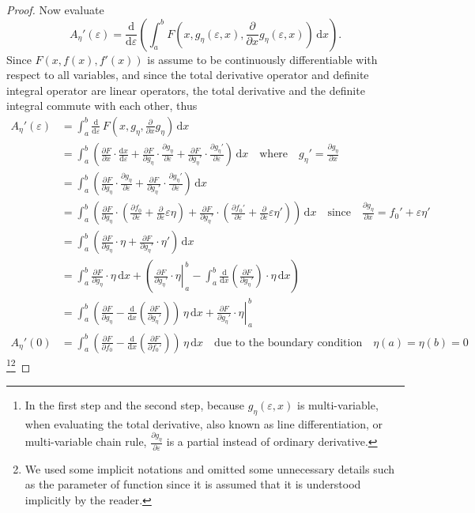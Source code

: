 \documentclass[12pt,a4paper]{article}
\begin{document}
\begin{proof}
Now evaluate
\[
{A_\eta}'(\varepsilon)=\frac{\mathrm{d}}{\mathrm{d}\varepsilon}\left(\int_a^bF\left(x,g_\eta(\varepsilon,x),\frac{\partial}{\partial x}g_\eta(\varepsilon,x)\right)\,\mathrm{d}x\right).
\]
Since $F(x,f(x),f'(x))$ is assume to be continuously differentiable with respect to all variables, and since the total derivative operator and definite integral operator are linear operators, the total derivative and the definite integral commute with each other, thus
\begin{align*}
{A_\eta}'(\varepsilon)&=\int_a^b\frac{\mathrm{d}}{\mathrm{d}\varepsilon}\,F\left(x,g_\eta,\frac{\partial}{\partial x}g_\eta\right)\,\mathrm{d}x\\
&=\int_a^b\left(\frac{\partial F}{\partial x}\cdot\frac{\mathrm{d}x}{\mathrm{d}\varepsilon}+\frac{\partial F}{\partial g_\eta}\cdot\frac{\partial g_\eta}{\partial\varepsilon}+\frac{\partial F}{\partial {g_\eta}'}\cdot\frac{\partial{g_\eta}'}{\partial\varepsilon}\right)\,\mathrm{d}x\quad\text{where}\quad{g_\eta}'=\frac{\partial g_\eta}{\partial x}\\
&=\int_a^b\left(\frac{\partial F}{\partial g_\eta}\cdot\frac{\partial g_\eta}{\partial\varepsilon}+\frac{\partial F}{\partial {g_\eta}'}\cdot\frac{\partial{g_\eta}'}{\partial\varepsilon}\right)\,\mathrm{d}x\\
&=\int_a^b\left(\frac{\partial F}{\partial g_\eta}\cdot\left(\frac{\partial f_0}{\partial\varepsilon}+\frac{\partial}{\partial\varepsilon}\varepsilon\eta\right)+\frac{\partial F}{\partial {g_\eta}'}\cdot\left(\frac{\partial{f_0}'}{\partial\varepsilon}+\frac{\partial}{\partial\varepsilon}\varepsilon\eta'\right)\right)\,\mathrm{d}x\quad\text{since}\quad\frac{\partial g_\eta}{\partial x}={f_0}'+\varepsilon\eta'\\
&=\int_a^b\left(\frac{\partial F}{\partial g_\eta}\cdot\eta+\frac{\partial F}{\partial {g_\eta}'}\cdot\eta'\right)\,\mathrm{d}x\\
&=\int_a^b\frac{\partial F}{\partial g_\eta}\cdot\eta\,\mathrm{d}x+\left(\left.\frac{\partial F}{\partial {g_\eta}'}\cdot\eta\right|_{\,a}^{\,b}-\int_a^b\frac{\mathrm{d}}{\mathrm{d}x}\left(\frac{\partial F}{\partial {g_\eta}'}\right)\cdot\eta\,\mathrm{d}x\right)\\
&=\int_a^b\left(\frac{\partial F}{\partial g_\eta}-\frac{\mathrm{d}}{\mathrm{d}x}\left(\frac{\partial F}{\partial {g_\eta}'}\right)\right)\,\eta\,\mathrm{d}x+\left.\frac{\partial F}{\partial {g_\eta}'}\cdot\eta\right|_{\,a}^{\,b}\\
{A_\eta}'(0)&=\int_a^b\left(\frac{\partial F}{\partial f_0}-\frac{\mathrm{d}}{\mathrm{d}x}\left(\frac{\partial F}{\partial {f_0}'}\right)\right)\,\eta\,\mathrm{d}x\quad\text{due to the boundary condition}\quad\eta(a)=\eta(b)=0
\end{align*}\footnote{In the first step and the second step, because $g_\eta(\varepsilon,x)$ is multi-variable, when evaluating the total derivative, also known as line differentiation, or multi-variable chain rule, $\displaystyle\frac{\partial g_\eta}{\partial\varepsilon}$ is a partial instead of ordinary derivative.}\footnote{We used some implicit notations and omitted some unnecessary details such as the parameter of function since it is assumed that it is understood implicitly by the reader.}


\end{proof}
\end{document}
